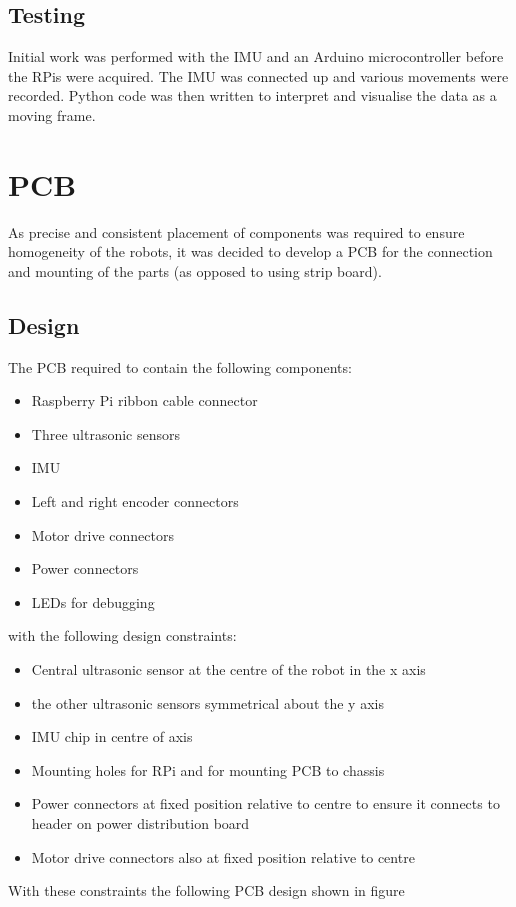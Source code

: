 \subsection{Testing}\label{elec/imu/test}
Initial work was performed with the IMU and an Arduino microcontroller before the RPis were acquired. The IMU was connected up and various movements were recorded. Python code was then written to interpret and visualise the data as a moving frame. 

\section{PCB}\label{elec/pcb}
As precise and consistent placement of components was required to ensure homogeneity of the robots, it was decided to develop a PCB for the connection and mounting of the parts (as opposed to using strip board).  
\subsection{Design}\label{elec/pcb/design}
The PCB required to contain the following components:
\begin{itemize}
  \item Raspberry Pi ribbon cable connector
  \item Three ultrasonic sensors
  \item IMU
  \item Left and right encoder connectors
  \item Motor drive connectors
  \item Power connectors
  \item LEDs for debugging
\end{itemize}

with the following design constraints:

\begin{itemize}
  \item Central ultrasonic sensor at the centre of the robot in the x axis
  \item the other ultrasonic sensors symmetrical about the y axis
  \item IMU chip in centre of axis
  \item Mounting holes for RPi and for mounting PCB to chassis
  \item Power connectors at fixed position relative to centre to ensure it connects to header on power distribution board
  \item Motor drive connectors also at fixed position relative to centre 
\end{itemize}
With these constraints the following PCB design shown in figure 

